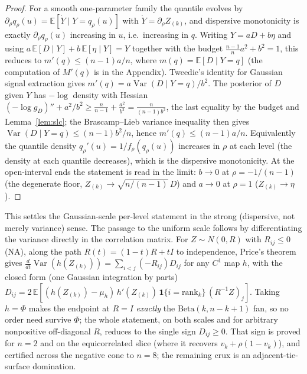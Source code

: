\documentclass[11pt]{article}
\begin{document}
\begin{proof}
For a smooth one-parameter family the quantile evolves by $\partial_\rho q_\rho(u)=
\mathbb E[\dot Y\mid Y=q_\rho(u)]$ with $\dot Y=\partial_\rho Z_{(k)}$, and dispersive monotonicity is
exactly $\partial_\rho q_\rho(u)$ increasing in $u$, i.e.\ increasing in $q$. Writing
$Y=aD+b\eta$ and using $a\,\mathbb E[D\mid Y]+b\,\mathbb E[\eta\mid Y]=Y$ together with the budget
$\tfrac{n-1}na^2+b^2=1$, this reduces to $m'(q)\le (n-1)a/n$, where $m(q)=\mathbb E[D\mid Y=q]$ (the
computation of $M'(q)$ is in the Appendix).
Tweedie's identity for Gaussian signal extraction gives $m'(q)=a\operatorname{Var}(D\mid Y=q)/b^2$.
The posterior of $D$ given $Y$ has $-\log$ density with Hessian
$(-\log g_D)''+a^2/b^2\ge \tfrac n{n-1}+\tfrac{a^2}{b^2}=\tfrac{n}{(n-1)b^2}$, the last equality by the
budget and Lemma~\ref{lem:slc}; the Brascamp--Lieb variance inequality \citep{brascamplieb1976} then
gives $\operatorname{Var}(D\mid Y=q)\le (n-1)b^2/n$, hence $m'(q)\le (n-1)a/n$. Equivalently the
quantile density $q_\rho'(u)=1/f_\rho(q_\rho(u))$ increases in $\rho$ at each level (the density at each
quantile decreases), which is the dispersive monotonicity. At the open-interval ends the statement is
read in the limit: $b\to0$ at $\rho=-1/(n-1)$ (the degenerate floor, $Z_{(k)}\to\sqrt{n/(n-1)}\,D$) and
$a\to0$ at $\rho=1$ ($Z_{(k)}\to\eta$).
\end{proof}

This settles the Gaussian-scale per-level statement in the strong (dispersive, not merely variance)
sense. The passage to the uniform scale follows by differentiating the variance directly in the
correlation matrix. For $Z\sim N(0,R)$ with $R_{ij}\le0$ (NA), along the path $R(t)=(1-t)R+tI$ to independence,
Price's theorem gives $\tfrac{d}{dt}\operatorname{Var}(h(Z_{(k)}))=\sum_{i<j}(-R_{ij})D_{ij}$ for any
$C^1$ map $h$, with the closed form (one Gaussian integration by parts)
$D_{ij}=2\,\mathbb E[(h(Z_{(k)})-\mu_h)\,h'(Z_{(k)})\,\mathbf 1\{i=\mathrm{rank}_k\}\,(R^{-1}Z)_j]$. Taking
$h=\Phi$ makes the endpoint at $R=I$ \emph{exactly} the $\mathrm{Beta}(k,n-k+1)$ fan, so no order need
survive $\Phi$; the whole statement, on both scales and for arbitrary nonpositive off-diagonal $R$,
reduces to the single sign $D_{ij}\ge0$. That sign is proved for $n=2$ and on the equicorrelated slice
(where it recovers $v_k+\rho(1-v_k)$), and certified across the negative cone to $n=8$; the remaining
crux is an adjacent-tie-surface domination.
\end{document}
